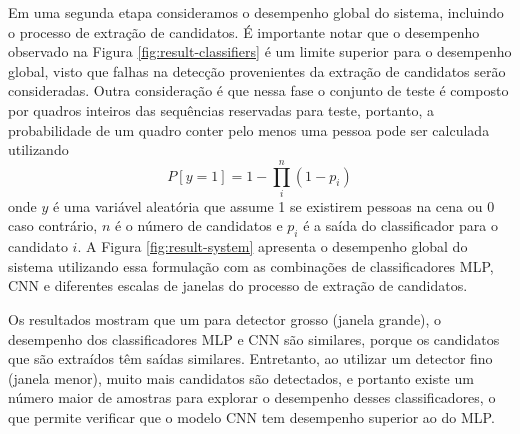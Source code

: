     \begin{figure*}[!t]
    \centering
    \label{fig:result-classifiers-all}
    \hfil
    \label{fig:result-classifiers-all-zoom}
    \caption{Desempenho dos classificadores.}
    \label{fig:result-classifiers}
    \end{figure*}

    Em uma segunda etapa consideramos o desempenho global do sistema, incluindo o processo de extração de candidatos. É importante notar que o desempenho observado na Figura \ref{fig:result-classifiers} é um limite superior para o desempenho global, visto que falhas na detecção provenientes da extração de candidatos serão consideradas. Outra consideração é que nessa fase o conjunto de teste é composto por quadros inteiros das sequências reservadas para teste, portanto, a probabilidade de um quadro conter pelo menos uma pessoa pode ser calculada utilizando
    \begin{equation}
    P[y=1] = 1 - \prod_i^n (1-p_i)
    \end{equation}
    onde $y$ é uma variável aleatória que assume 1 se existirem pessoas na cena ou 0 caso contrário, $n$ é o número de candidatos e $p_i$ é a saída do classificador para o candidato $i$. A Figura \ref{fig:result-system} apresenta o desempenho global do sistema utilizando essa formulação com as combinações de classificadores MLP, CNN e diferentes escalas de janelas do processo de extração de candidatos.

    Os resultados mostram que um para detector grosso (janela grande), o desempenho dos classificadores MLP e CNN são similares, porque os candidatos que são extraídos têm saídas similares. Entretanto, ao utilizar um detector fino (janela menor), muito mais candidatos são detectados, e portanto existe um número maior de amostras para explorar o desempenho desses classificadores, o que permite verificar que o modelo CNN tem desempenho superior ao do MLP.

    \begin{figure*}[!t]
    \centering
    \label{fig:result-system-all}
    \hfil
    \label{fig:result-system-all-zoom}
    \caption{Desempenho global do sistema.}
    \label{fig:result-system}
    \end{figure*}

